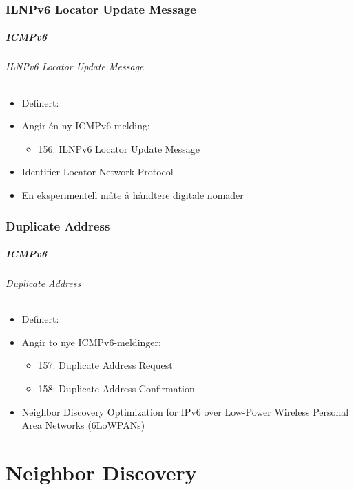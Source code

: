 \section{ILNPv6 Locator Update Message}
\begin{frame}%
  \frametitle{ICMPv6}
  \framesubtitle{ILNPv6 Locator Update Message}
  \begin{itemize}%
  \item Definert: 
  \item Angir én ny ICMPv6-melding:
    \begin{itemize}%
    \item 156: ILNPv6 Locator Update Message
    \end{itemize}
  \item Identifier-Locator Network Protocol
  \item En eksperimentell måte å håndtere digitale nomader
  \end{itemize}
\end{frame}

\section{Duplicate Address}
\begin{frame}%
  \frametitle{ICMPv6}
  \framesubtitle{Duplicate Address}
  \begin{itemize}%
  \item Definert: 
  \item Angir to nye ICMPv6-meldinger:
    \begin{itemize}%
    \item 157: Duplicate Address Request
    \item 158: Duplicate Address Confirmation
    \end{itemize}
  \item Neighbor Discovery Optimization for IPv6 over Low-Power
    Wireless Personal Area Networks (6LoWPANs)
  \end{itemize}
\end{frame}

\part{Neighbor Discovery}

\begin{frame}
  \partpage
\end{frame}

